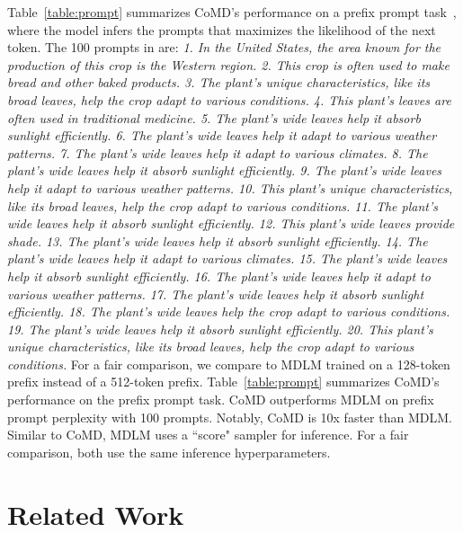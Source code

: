 Table~\ref{table:prompt} summarizes CoMD's performance on a prefix prompt task~\citep{liao-etal-2020-probabilistically}, where the model infers the prompts that maximizes the likelihood of the next token. The 100 prompts in \citet{shih2022training} are: \textit{1. In the United States, the area known for the production of this crop is the Western region. 2. This crop is often used to make bread and other baked products. 3. The plant's unique characteristics, like its broad leaves, help the crop adapt to various conditions. 4. This plant's leaves are often used in traditional medicine. 5. The plant's wide leaves help it absorb sunlight efficiently. 6. The plant's wide leaves help it adapt to various weather patterns. 7. The plant's wide leaves help it adapt to various climates. 8. The plant's wide leaves help it absorb sunlight efficiently. 9. The plant's wide leaves help it adapt to various weather patterns. 10. This plant's unique characteristics, like its broad leaves, help the crop adapt to various conditions. 11. The plant's wide leaves help it absorb sunlight efficiently. 12. This plant's wide leaves provide shade. 13. The plant's wide leaves help it absorb sunlight efficiently. 14. The plant's wide leaves help it adapt to various climates. 15. The plant's wide leaves help it absorb sunlight efficiently. 16. The plant's wide leaves help it adapt to various weather patterns. 17. The plant's wide leaves help it absorb sunlight efficiently. 18. The plant's wide leaves help the crop adapt to various conditions. 19. The plant's wide leaves help it absorb sunlight efficiently. 20. This plant's unique characteristics, like its broad leaves, help the crop adapt to various conditions.} For a fair comparison, we compare to MDLM trained on a 128-token prefix instead of a 512-token prefix.  Table~\ref{table:prompt} summarizes CoMD's performance on the prefix prompt task. CoMD outperforms MDLM on prefix prompt perplexity with 100 prompts. Notably, CoMD is 10x faster than MDLM. Similar to CoMD, MDLM uses a ``score" sampler for inference. For a fair comparison, both use the same inference hyperparameters. 


\section{Related Work}

